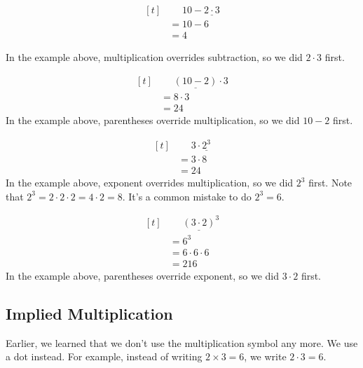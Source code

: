 \begin{myexample}
\[
\begin{aligned}[t]
    &\phantom{{}=} 10-\underline{2\cdot3}    \\
    &= 10-6 \\
   &= 4
\end{aligned}
\]

In the example above, multiplication overrides subtraction, so we did $2\cdot3$ first.
\end{myexample}

\begin{myexample}
\[
\begin{aligned}[t]
   &\phantom{{}=} \underline{(10-2)}\cdot3 \\
   &= 8\cdot3 \\
   &= 24
\end{aligned}
\]
In the example above, parentheses override multiplication, so we did $10-2$ first.
\end{myexample}

\begin{myexample}
\[
\begin{aligned}[t]
   &\phantom{{}=} 3\cdot \underline{2^{3}} \\
   &= 3\cdot 8 \\
   &= 24
\end{aligned}
\]
In the example above, exponent overrides multiplication, so we did $2^{3}$ first. Note that $2^{3}=2\cdot2\cdot2=4\cdot2=8$. It's a common mistake to do $2^{3}=6$.
\end{myexample}

\begin{myexample}
\[
\begin{aligned}[t]
   &\phantom{{}=} \underline{(3\cdot2)}^{3} \\
   &= 6^{3} \\
   &= 6\cdot6\cdot6 \\
   &= 216
\end{aligned}
\]
In the example above, parentheses override exponent, so we did $3\cdot2$ first.
\end{myexample}


\subsection{Implied Multiplication}

Earlier, we learned that we don't use the multiplication symbol any more. We use a dot instead. For example, instead of writing $2\times3=6$, we write $2\cdot3=6$.

